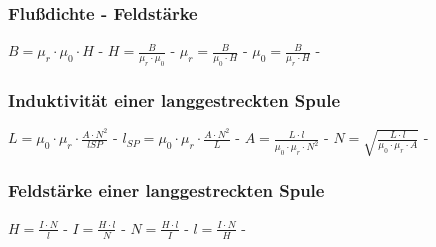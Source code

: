 \subsubsection{Flußdichte - Feldstärke} 
\begin{minipage}{0.45\textwidth} 
\end{minipage} 
\begin{minipage}{0.45\textwidth} 
 
\legende{}\end{minipage} 
 
$ B = \mu _{r} \cdot \mu _{0} \cdot H $ - $ H =\frac{ B}{\mu _{r} \cdot \mu _{0} } $ - $ \mu _{r} =\frac{ B}{\mu _{0} \cdot H} $ - $ \mu _{0} =\frac{ B}{\mu _{r} \cdot H} $ - \\ 
 
\subsubsection{Induktivität einer langgestreckten Spule} 
\begin{minipage}{0.45\textwidth} 
\end{minipage} 
\begin{minipage}{0.45\textwidth} 
 
\legende{}\end{minipage} 
 
$ L = \mu _{0} \cdot \mu _{r} \cdot \frac{A\cdot N^{2} }{lSP} $ - $ l_{SP} = \mu _{0} \cdot \mu _{r} \cdot \frac{A\cdot N^{2} }{L} $ - $ A = \frac{ L\cdot l}{\mu _{0} \cdot \mu _{r} \cdot N^{2} } $ - $ N = \sqrt{\frac{ L\cdot l}{\mu _{0} \cdot \mu _{r} \cdot A}} $ - \\ 
 
\subsubsection{Feldstärke einer langgestreckten Spule} 
\begin{minipage}{0.45\textwidth} 
\end{minipage} 
\begin{minipage}{0.45\textwidth} 
 
\legende{}\end{minipage} 
 
$ H = \frac{I\cdot N}{ l} $ - $ I = \frac{H\cdot l}{ N} $ - $ N = \frac{H\cdot l}{ I} $ - $ l = \frac{I\cdot N}{ H} $ - \\ 
 

